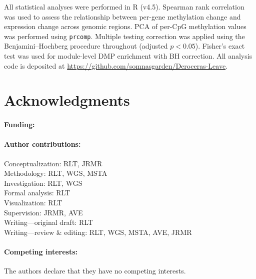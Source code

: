 \documentclass[12pt]{article}
\begin{document}
All statistical analyses were performed in R (v4.5). Spearman rank correlation was used to assess the relationship between per-gene methylation change and expression change across genomic regions. PCA of per-CpG methylation values was performed using \texttt{prcomp}. Multiple testing correction was applied using the Benjamini--Hochberg procedure throughout (adjusted $p < 0.05$). Fisher's exact test was used for module-level DMP enrichment with BH correction. All analysis code is deposited at \url{https://github.com/somnasgarden/Deroceras-Leave}.







\section*{Acknowledgments}

\paragraph{Funding:}

\paragraph{Author contributions:}
Conceptualization: RLT, JRMR\\
Methodology: RLT, WGS, MSTA\\
Investigation: RLT, WGS\\
Formal analysis: RLT\\
Visualization: RLT\\
Supervision: JRMR, AVE\\
Writing---original draft: RLT\\
Writing---review \& editing: RLT, WGS, MSTA, AVE, JRMR

\paragraph{Competing interests:}
The authors declare that they have no competing interests.
\end{document}
